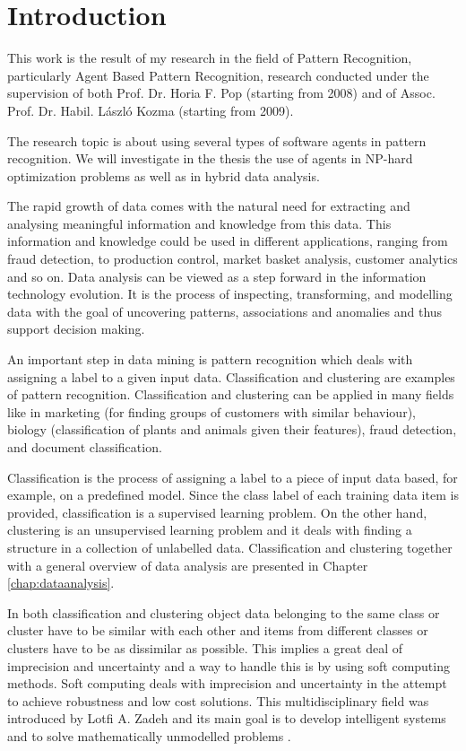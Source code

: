 \chapter*{Introduction}

This work is the result of my research in the field of Pattern Recognition, particularly Agent Based Pattern Recognition, research conducted under the supervision of both Prof. Dr. Horia F. Pop (starting from 2008) and of Assoc. Prof. Dr. Habil. L\'{a}szl\'{o} Kozma (starting from 2009).

The research topic is about using several types of software agents in pattern recognition. We will investigate in the thesis the use of agents in NP-hard optimization problems as well as in hybrid data analysis. 

The rapid growth of data comes with the natural need for extracting and analysing meaningful information and knowledge from this data. This information and knowledge could be used in different applications, ranging from fraud detection, to production control, market basket analysis, customer analytics and so on. Data analysis can be viewed as a step forward in the information technology evolution. It is the process of inspecting, transforming, and modelling data with the goal of uncovering patterns, associations and anomalies and thus support decision making. 

An important step in data mining is pattern recognition which deals with assigning a label to a given input data. Classification and clustering are examples of pattern recognition. Classification and clustering can be applied in many fields like in marketing (for finding groups of customers with similar behaviour), biology (classification of plants and animals given their features), fraud detection, and document classification. 

Classification is the process of assigning a label to a piece of input data based, for example, on a predefined model. Since the class label of each training data item is provided, classification is a supervised learning problem. On the other hand, clustering is an unsupervised learning problem and it deals with finding a structure in a collection of unlabelled data. Classification and clustering together with a general overview of data analysis are presented in Chapter \ref{chap:dataanalysis}.

In both classification and clustering object data belonging to the same class or cluster have to be similar with each other and items from different classes or clusters have to be as dissimilar as possible. This implies a great deal of imprecision and uncertainty and a way to handle this is by using soft computing methods. Soft computing deals with imprecision and uncertainty in the attempt to achieve robustness and low cost solutions. This multidisciplinary field was introduced by Lotfi A. Zadeh and its main goal is to develop intelligent systems and to solve mathematically unmodelled problems \cite{Zadeh97TheRoles, TFLSC07, SoftComputingDM09}. 

